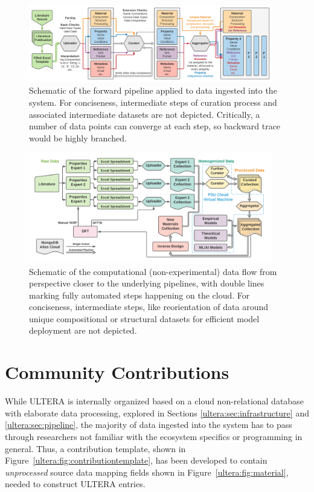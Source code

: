 \todo

\begin{figure}[H]
    \centering
    \includegraphics[width=0.95\textwidth]{ultera/ULTERA Data Detail.png}
    \caption{Schematic of the forward pipeline applied to data ingested into the system. For conciseness, intermediate steps of curation process and associated intermediate datasets are not depicted. Critically, a number of data points can converge at each step, so backward trace would be highly branched.}
    \label{ultera:fig:datapipeline}
\end{figure}


\begin{figure}[H]
    \centering
    \includegraphics[width=0.95\textwidth]{ultera/ULTERA_Data_Cycle_v2.png}
    \caption{Schematic of the computational (non-experimental) data flow from perspective closer to the underlying pipelines, with double lines marking fully automated steps happening on the cloud. For conciseness, intermediate steps, like reorientation of data around unique compositional or structural datasets for efficient model deployment are not depicted.}
    \label{ultera:fig:datacycles}
\end{figure}




\section{Community Contributions} \label{ultera:sec:contributions}

While ULTERA is internally organized based on a cloud non-relational database with elaborate data processing, explored in Sections \ref{ultera:sec:infrastructure} and \ref{ultera:sec:pipeline}, the majority of data ingested into the system has to pass through researchers not familiar with the ecosystem specifics or programming in general. Thus, a contribution template, shown in Figure~\ref{ultera:fig:contributiontemplate}, has been developed to contain \emph{unprocessed} source data mapping fields shown in Figure~\ref{ultera:fig:material}, needed to construct ULTERA entries.

